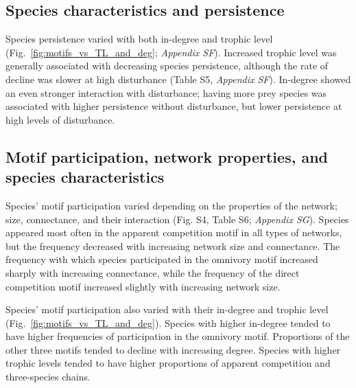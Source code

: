 \documentclass[12pt]{article}
\begin{document}
\begin{spacing}{2.0}
    \subsection*{Species characteristics and persistence}
    
        Species persistence varied with both in-degree and trophic level (Fig.~\ref{fig:motifs_vs_TL_and_deg}; \emph{Appendix SF}). 
        Increased trophic level was generally associated with decreasing species persistence, although the rate of decline was slower at high disturbance (Table S5, \emph{Appendix SF}).
        In-degree showed an even stronger interaction with disturbance; having more prey species was associated with higher persistence without disturbance, but lower persistence at high levels of disturbance.


    
    \subsection*{Motif participation, network properties, and species characteristics}

        Species' motif participation varied depending on the properties of the network; size, connectance, and their interaction (Fig. S4, Table S6; \emph{Appendix SG}).
        Species appeared most often in the apparent competition motif in all types of networks, but the frequency decreased with increasing network size and connectance.
        The frequency with which species participated in the omnivory motif increased sharply with increasing connectance, while the frequency of the direct competition motif increased slightly with increasing network size. 
        
        Species' motif participation also varied with their in-degree and trophic level (Fig.~\ref{fig:motifs_vs_TL_and_deg}).
        Species with higher in-degree tended to have higher frequencies of participation in the omnivory motif. Proportions of the other three motifs tended to decline with increasing degree.
        Species with higher trophic levels tended to have higher proportions of apparent competition and three-species chains. 
        


\end{spacing}
\end{document}
